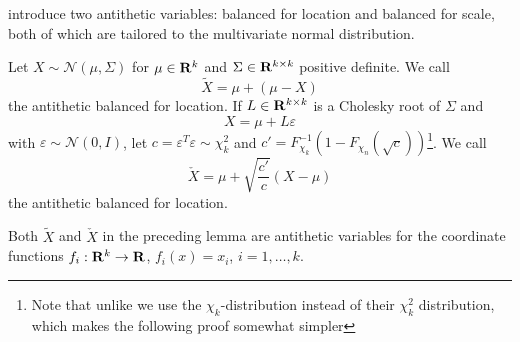 \citep{Durbin1997Monte} introduce two antithetic variables: balanced for location and balanced for scale, both of which are tailored to the multivariate normal distribution. 
\begin{definition}
    Let $X\sim \mathcal N(\mu, \Sigma)$ for $\mu \in \mathbf R^{k}$ and $\Sigma \in \mathbf R^{k\times k}$ positive definite. We call
    $$
    \tilde X = \mu + (\mu - X)
    $$
    the antithetic balanced for location. If $L\in\mathbf R^{k\times k}$ is a Cholesky root of $\Sigma$ and 
    $$
        X = \mu + L \varepsilon
    $$
    with $\varepsilon \sim \mathcal N(0, I)$, let $c = \varepsilon^{T}\varepsilon \sim \chi^{2}_k$ and $c' = F^{-1}_{\chi_{k}}(1 - F_{\chi_n}(\sqrt{c}))$\footnote{Note that unlike \citep{Durbin1997Monte} we use the $\chi_{k}$-distribution instead of their $\chi^{2}_k$ distribution, which makes the following proof somewhat simpler}. We call
    $$
        \check X = \mu + \sqrt{\frac{c'}{c}} \left( X - \mu \right)
    $$
    the antithetic balanced for location.
\end{definition}
\begin{lemma}
    Both $\tilde X$ and $\check X$ in the preceding lemma are antithetic variables for the coordinate functions $f_{i}:\mathbf R^{k} \to \mathbf R$, $f_{i}(x) = x_{i}$, $i = 1, \dots, k$.
\end{lemma}
